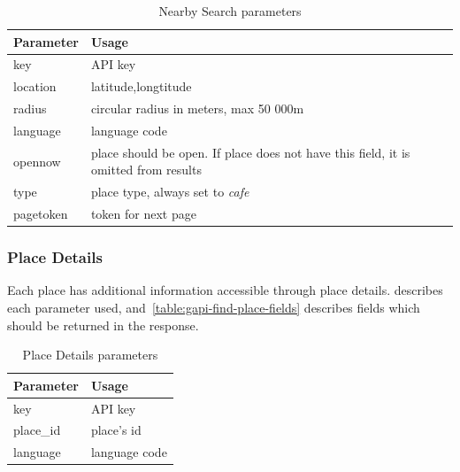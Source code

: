 \begin{table}[htbp]
\centering
\begin{tabularx}{\textwidth}{|l|X|}
\hline
\textbf{Parameter} & \textbf{Usage} \\ \hline
key                & API key \\ \hline
location           & latitude,longtitude \\ \hline
radius             & circular radius in meters, max 50 000m  \\ \hline
language           & language code \\ \hline
opennow         & place should be open. If place does not have this field, it is omitted from results  \\ \hline
type & place type, always set to \textit{cafe} \\ \hline
pagetoken & token for next page \\ \hline 
\end{tabularx}
\caption{Nearby Search parameters}
\label{table:gapi-nearby-search-parameters}
\end{table}
\subsubsection{Place Details}
Each place has additional information accessible through place details.  describes each parameter used, and~\cref{table:gapi-find-place-fields} describes fields which should be returned in the response.

\begin{table}[htbp]
\centering
\begin{tabularx}{\textwidth}{|l|X|}
\hline
\textbf{Parameter} & \textbf{Usage} \\ \hline
key                & API key \\ \hline
place\_id           & place's id \\ \hline
language           & language code \\ \hline
\end{tabularx}
\caption{Place Details parameters}
\label{table:gapi-details-parameters}
\end{table}

